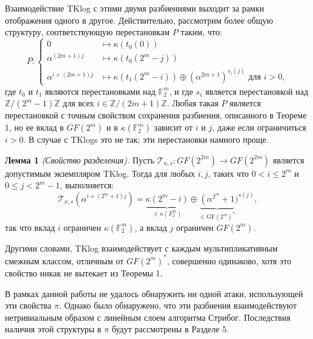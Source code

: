 Взаимодействие TKlog с этими двумя разбиениями выходит за рамки отображения одного в другое. Действительно, рассмотрим более общую структуру, соответствующую перестановкам \( P \) таким, что:
\[
P :
\begin{cases}
0 & \mapsto \kappa (t_0(0)) \\
\alpha^{(2m+1)j} & \mapsto \kappa (t_0(2^m - j)) \\
\alpha^{i+(2m+1)j} & \mapsto \kappa (t_1(2^m - i)) \oplus (\alpha^{2m+1})^{s_i(j)} \text{ для } i > 0,
\end{cases}
\]
где \( t_0 \) и \( t_1 \) являются перестановками над \( \mathbb{F}_{2}^{m} \), и где \( s_i \) является перестановкой над \( \mathbb{Z}/(2^m - 1)\mathbb{Z} \) для всех \( i \in \mathbb{Z}/(2m + 1)\mathbb{Z} \). Любая такая \( P \) является перестановкой с точным свойством сохранения разбиения, описанного в Теореме 1, но ее вклад в \( GF (2^m) \) и в \( \kappa(\mathbb{F}_{2}^{m}) \) зависит от \( i \) и \( j \), даже если ограничиться \( i > 0 \). В случае с TKlogs это не так; эти перестановки намного проще.

\textbf{Лемма 1} \textit{(Свойство разделения).} Пусть \( \mathscr{T}_{\kappa,s} : GF(2^{2m}) \to GF(2^{2m}) \) является допустимым экземпляром TKlog. Тогда для любых \( i, j \), таких что \( 0 < i \leq 2^m \) и \( 0 \leq j < 2^m - 1 \), выполняется:
\[
  \mathscr{T}_{\kappa, s}\left(\alpha^{i+\left(2^m+1\right) j}\right)=\underbrace{\kappa\left(2^m-i\right)}_{\in \kappa\left(F_2^m\right)} \oplus \underbrace{\left(\alpha^{2^m}+1\right.}_{\in \mathrm{GF}\left(2^m\right)^*})^{s(j)},
\]
так что вклад \( i \) ограничен \( \kappa(\mathbb{F}_{2}^{m}) \), а вклад \( j \) ограничен \( GF(2^m) \).

Другими словами, TKlog взаимодействует с каждым мультипликативным смежным классом, отличным от \( GF(2^m)^{\ast} \), совершенно одинаково, хотя это свойство никак не вытекает из Теоремы 1.

В рамках данной работы не удалось обнаружить ни одной атаки, использующей эти свойства \( \pi \). Однако было обнаружено, что эти разбиения взаимодействуют нетривиальным образом с линейным слоем алгоритма Стрибог. Последствия наличия этой структуры в \( \pi \) будут рассмотрены в Разделе 5.
